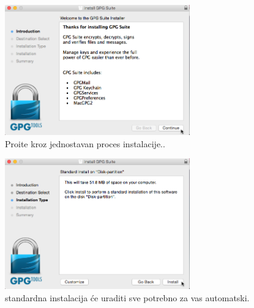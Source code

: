 \documentclass[a4paper,11pt]{article}
\begin{document}
\begin{figure}[!h]
	\begin{center}
		\includegraphics[width=8cm]{04_Oracle_VM_VirtualBox.png}
		\caption{Pro\dj{}ite kroz jednostavan proces instalacije..}
		\label{gpgtools_install2}
	\end{center}
\end{figure}
\newpage
\begin{figure}[!h]
	\begin{center}
		\includegraphics[width=8cm]{05_Oracle_VM_VirtualBox.png}
		\caption{standardna instalacija \'{c}e uraditi sve potrebno za vas automatski.}
		\label{gpgtools_install3}
	\end{center}
\end{figure}
\end{document}
